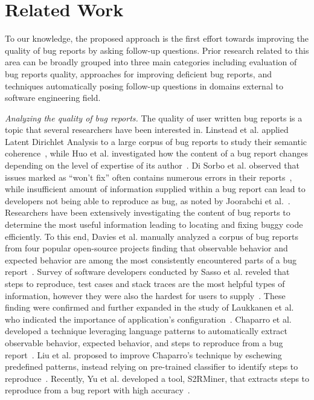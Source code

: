 \section{Related Work}
To our knowledge, the proposed approach is the first effort towards improving the quality of bug reports by asking follow-up questions. Prior research related to this area can be broadly grouped into three main categories including evaluation of bug reports quality, approaches for improving deficient bug reports, and techniques automatically posing follow-up questions in domains external to software engineering field.

\noindent
{\em Analyzing the quality of bug reports.} The quality of user written bug reports is a topic that several researchers have been interested in. Linstead et al. applied Latent Dirichlet Analysis to a large corpus of bug reports to study their semantic coherence~\cite{linstead09mining}, while Huo et al. investigated how the  content of a bug report changes depending on the level of expertise of its author~\cite{Huo2014AnES}. Di Sorbo et al. observed that issues marked as ``won't fix'' often contains numerous errors in their reports~\cite{Sorbo2019WontWF}, while insufficient amount of information supplied within a bug report can lead to developers not being able to reproduce as bug, as noted by Joorabchi et al.~\cite{erfani2014works}.
Researchers have been extensively investigating the content of bug reports to determine the most useful information leading to locating and fixing buggy code efficiently.
To this end, Davies et al. manually analyzed a corpus of bug reports from four popular open-source projects finding that observable behavior and expected behavior are among the most consistently encountered parts of a bug report~\cite{davies14whats}. Survey of software developers conducted by Sasso et al. reveled that steps to reproduce, test cases and stack traces are the most helpful types of information, however they were also the hardest for users to supply~\cite{sasso2016satisficing}. These finding were confirmed and further expanded in the study of Laukkanen et al. who indicated the importance of application's configuration~\cite{laukkanen2011survey}. Chaparro et al. developed a technique leveraging language patterns to automatically extract observable behavior, expected behavior, and steps to reproduce from a bug report~\cite{chaparro17detecting}. Liu et al. proposed to improve Chaparro's technique by eschewing predefined patterns, instead relying on pre-trained classifier to identify steps to reproduce~\cite{liu2020automated}. Recently, Yu et al. developed a tool, S2RMiner, that extracts steps to reproduce from a bug report with high accuracy~\cite{yu2019s2rminer}.

